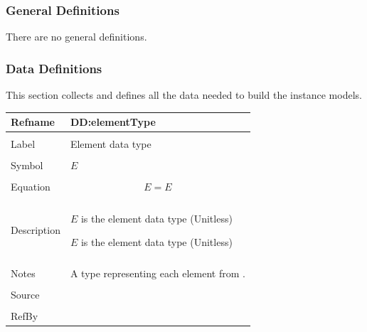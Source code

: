 \documentclass[12pt]{article}
\begin{document}
\subsubsection{General Definitions}
\label{Sec:GDs}
There are no general definitions.

\subsubsection{Data Definitions}
\label{Sec:DDs}
This section collects and defines all the data needed to build the instance models.

\vspace{\baselineskip}
\noindent
\begin{minipage}{\textwidth}
\begin{tabular}{>{\raggedright}p{}>{\raggedright\arraybackslash}p{}}
\toprule \textbf{Refname} & \textbf{DD:elementType}
\label{DD:elementType}
\\ \midrule \\
Label & Element data type
        
\\ \midrule \\
Symbol & $E$
         
\\ \midrule \\
Equation & \begin{displaymath}
           E=E
           \end{displaymath}
\\ \midrule \\
Description & \begin{symbDescription}
              \item{$E$ is the element data type (Unitless)}
              \item{$E$ is the element data type (Unitless)}
              \end{symbDescription}
\\ \midrule \\
Notes & A type representing each element from \cite{elemListWiki}.
        
\\ \midrule \\
Source & \cite{smithChemSpec}
         
\\ \midrule \\
RefBy & 
\\ \bottomrule
\end{tabular}
\end{minipage}
\end{document}

